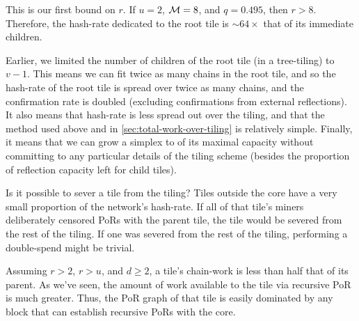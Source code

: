 This is our first bound on $r$.
If $u = 2$, $\mathcal{M} = 8$, and $q = 0.495$, then $r > 8$.
Therefore, the hash-rate dedicated to the root tile is $\sim 64 \times$ that of its immediate children.





Earlier, we limited the number of children of the root tile (in a tree-tiling) to $v-1$.
This means we can fit twice as many chains in the root tile, and so the hash-rate of the root tile is spread over twice as many chains, and the confirmation rate is doubled (excluding confirmations from external reflections).
It also means that hash-rate is less spread out over the tiling, and that the method used above and in \autoref{sec:total-work-over-tiling} is relatively simple.
Finally, it means that we can grow a simplex to  of its maximal capacity without committing to any particular details of the tiling scheme (besides the proportion of reflection capacity left for child tiles).


Is it possible to sever a tile from the tiling?
Tiles outside the core have a very small proportion of the network's hash-rate.
If all of that tile's miners deliberately censored PoRs with the parent tile, the tile would be severed from the rest of the tiling.
If one was severed from the rest of the tiling, performing a double-spend might be trivial.

Assuming $r > 2$, $r > u$, and $d \ge 2$, a tile's chain-work is less than half that of its parent.
As we've seen, the amount of work available to the tile via recursive PoR is much greater.
Thus, the PoR graph of that tile is easily dominated by any block that can establish recursive PoRs with the core.

